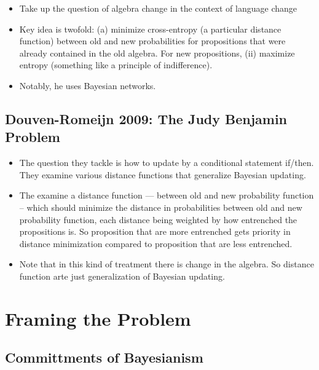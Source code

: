 \documentclass[
  11pt,
  dvipsnames,enabledeprecatedfontcommands]{scrartcl}
\begin{document}
\begin{itemize}
\item
  Take up the question of algebra change in the context of language
  change
\item
  Key idea is twofold: (a) minimize cross-entropy (a particular distance
  function) between old and new probabilities for propositions that were
  already contained in the old algebra. For new propositions, (ii)
  maximize entropy (something like a principle of indifference).
\item
  Notably, he uses Bayesian networks.
\end{itemize}

\hypertarget{douven-romeijn-2009-the-judy-benjamin-problem}{%
\subsection{Douven-Romeijn 2009: The Judy Benjamin
Problem}\label{douven-romeijn-2009-the-judy-benjamin-problem}}

\begin{itemize}
\item
  The question they tackle is how to update by a conditional statement
  if/then. They examine various distance functions that generalize
  Bayesian updating.
\item
  The examine a distance function --- between old and new probability
  function -- which should minimize the distance in probabilities
  between old and new probability function, each distance being weighted
  by how entrenched the propositions is. So proposition that are more
  entrenched gets priority in distance minimization compared to
  proposition that are less entrenched.
\item
  Note that in this kind of treatment there is change in the algebra. So
  distance function arte just generalization of Bayesian updating.
\end{itemize}

\hypertarget{framing-the-problem}{%
\section{Framing the Problem}\label{framing-the-problem}}

\hypertarget{committments-of-bayesianism}{%
\subsection{Committments of
Bayesianism}\label{committments-of-bayesianism}}
\end{document}
